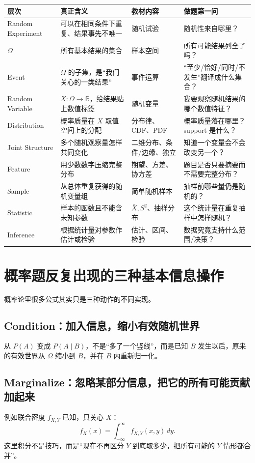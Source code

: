 \documentclass[11pt,a4paper,openany]{ctexbook}
\begin{document}
\begin{longtable}{L{2.5cm}L{5.0cm}L{3.7cm}L{\dimexpr\linewidth-12.17cm\relax}}
\toprule
\textbf{层次} & \textbf{真正含义} & \textbf{教材内容} & \textbf{做题第一问}\\
\midrule
Random Experiment & 可以在相同条件下重复、结果事先不唯一 & 随机试验 & 随机性来自哪里？\\
$\Omega$ & 所有基本结果的集合 & 样本空间 & 所有可能结果列全了吗？\\
Event & $\Omega$ 的子集，是“我们关心的一类结果” & 事件运算 & “至少/恰好/同时/不发生”翻译成什么集合？\\
Random Variable & $X:\Omega\to\mathbb R$，给结果贴上数值标签 & 随机变量 & 我要观察随机结果的哪个数值特征？\\
Distribution & 概率质量在 $X$ 取值空间上的分配 & 分布律、CDF、PDF & 概率质量落在哪里？support 是什么？\\
Joint Structure & 多个随机观察量怎样共同变化 & 二维分布、条件/边缘、独立 & 知道一个变量会不会改变另一个？\\
Feature & 用少数数字压缩完整分布 & 期望、方差、协方差 & 题目是否只要摘要而不需要完整分布？\\
Sample & 从总体重复获得的随机变量组 & 简单随机样本 & 抽样前哪些量仍是随机的？\\
Statistic & 样本的函数且不能含未知参数 & $\bar X,S^2$、抽样分布 & 这个统计量在重复抽样中怎样随机？\\
Inference & 根据统计量对参数作估计或检验 & 估计、区间、检验 & 数据究竟支持什么范围/决策？\\
\bottomrule
\end{longtable}

\section{概率题反复出现的三种基本信息操作}
概率论里很多公式其实只是三种动作的不同实现。

\subsection{Condition：加入信息，缩小有效随机世界}
从 $P(A)$ 变成 $P(A\mid B)$，不是“多了一个竖线”，而是已知 $B$ 发生以后，原来的有效世界从 $\Omega$ 缩小到 $B$，并在 $B$ 内重新归一化。

\subsection{Marginalize：忽略某部分信息，把它的所有可能贡献加起来}
例如联合密度 $f_{X,Y}$ 已知，只关心 $X$：
\[
f_X(x)=\int_{-\infty}^{\infty} f_{X,Y}(x,y)\,dy.
\]
这里积分不是技巧，而是“现在不再区分 $Y$ 到底取多少，把所有可能的 $Y$ 情形都合并”。
\end{document}

